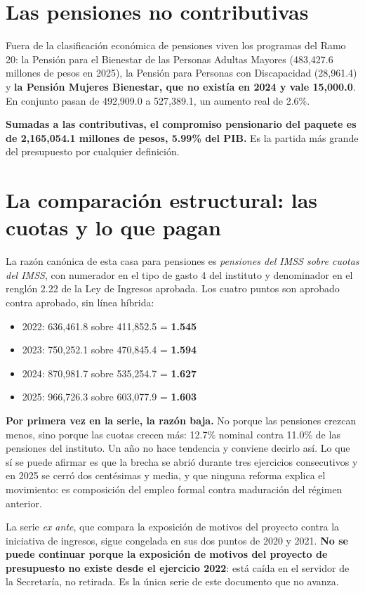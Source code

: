 \section{Las pensiones no contributivas}

Fuera de la clasificación económica de pensiones viven los programas del Ramo 20:
la Pensión para el Bienestar de las Personas Adultas Mayores (483,427.6 millones
de pesos en 2025), la Pensión para Personas con Discapacidad (28,961.4) y
\textbf{la Pensión Mujeres Bienestar, que no existía en 2024 y vale 15,000.0}. En
conjunto pasan de 492,909.0 a 527,389.1, un aumento real de 2.6\%.

\textbf{Sumadas a las contributivas, el compromiso pensionario del paquete es de
2,165,054.1 millones de pesos, 5.99\% del PIB.} Es la partida más grande del
presupuesto por cualquier definición.

\section{La comparación estructural: las cuotas y lo que pagan}

La razón canónica de esta casa para pensiones es \emph{pensiones del IMSS sobre
cuotas del IMSS}, con numerador en el tipo de gasto 4 del instituto y denominador
en el renglón 2.22 de la Ley de Ingresos aprobada. Los cuatro puntos son aprobado
contra aprobado, sin línea híbrida:

\begin{itemize}
\item 2022: 636,461.8 sobre 411,852.5 = \textbf{1.545}
\item 2023: 750,252.1 sobre 470,845.4 = \textbf{1.594}
\item 2024: 870,981.7 sobre 535,254.7 = \textbf{1.627}
\item 2025: 966,726.3 sobre 603,077.9 = \textbf{1.603}
\end{itemize}

\textbf{Por primera vez en la serie, la razón baja.} No porque las pensiones
crezcan menos, sino porque las cuotas crecen más: 12.7\% nominal contra 11.0\% de
las pensiones del instituto. Un año no hace tendencia y conviene decirlo así. Lo
que sí se puede afirmar es que la brecha se abrió durante tres ejercicios
consecutivos y en 2025 se cerró dos centésimas y media, y que ninguna reforma
explica el movimiento: es composición del empleo formal contra maduración del
régimen anterior.

La serie \emph{ex ante}, que compara la exposición de motivos del proyecto contra
la iniciativa de ingresos, sigue congelada en sus dos puntos de 2020 y 2021.
\textbf{No se puede continuar porque la exposición de motivos del proyecto de
presupuesto no existe desde el ejercicio 2022}: está caída en el servidor de la
Secretaría, no retirada. Es la única serie de este documento que no avanza.

